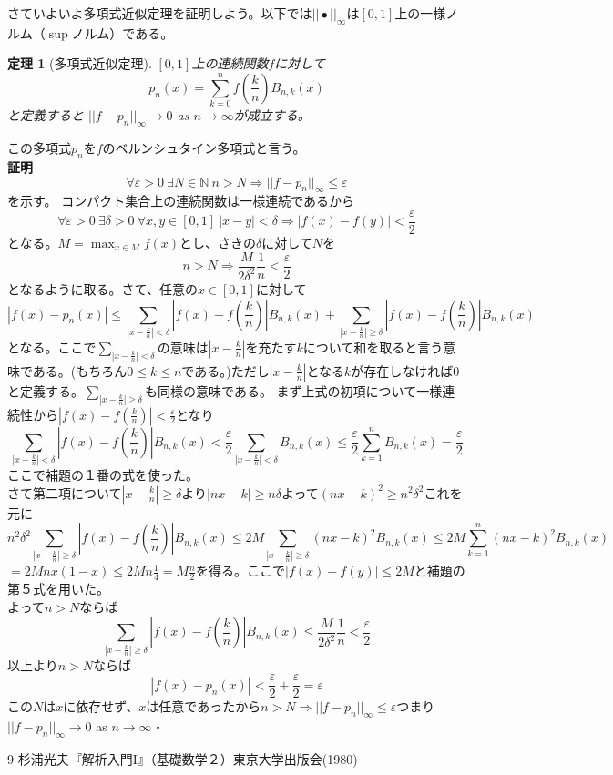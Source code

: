 \documentclass[leqno]{jsarticle}
\newtheorem{thm}{定理}
\renewcommand{\proofname}{{\bf 証明}}
\newcommand{\Be}[3]{B_{#1,#2}(#3)}
\newcommand{\bb}{B_{n,k}(x)}
\begin{document}
さていよいよ多項式近似定理を証明しよう。以下では$||\bullet||_{\infty}$は$[0,1]$上の一様ノルム（$\sup$ノルム）である。
\begin{thm}[多項式近似定理]
$[0,1]$上の連続関数$f$に対して
\[p_n(x)=\sum_{k=0}^{n}f\left(\frac{k}{n}\right)\Be{n}{k}{x}\]と定義すると
$||f-p_n||_{\infty}\rightarrow 0$ as $ n\rightarrow \infty$が成立する。
\end{thm}この多項式$p_n$を$f$のベルンシュタイン多項式と言う。\\ 
\proofname\\ 
\[
\forall \varepsilon >0\ \exists N\in \mathbb{N}\ n>N\Rightarrow ||f-p_n||_{\infty}\le\varepsilon
\]を示す。
コンパクト集合上の連続関数は一様連続であるから
\[
\forall \varepsilon>0\ \exists \delta>0\ \forall x,y\in [0,1]\ |x-y|<\delta \Rightarrow |f(x)-f(y)|<\frac{\varepsilon}{2}
\]
となる。$\displaystyle M=\max _{x\in M}f(x)$とし、さきの$\delta$に対して$N$を
\[
n>N\Rightarrow \frac{M}{2\delta^2}\frac{1}{n}<\frac{\varepsilon}{2}
\]となるように取る。さて、任意の$x\in [0,1]$に対して
\[
|f(x)-p_n(x)|\le\sum_{|x-\frac{k}{n}|<\delta}\left|f(x)-f\left(\frac{k}{n}\right)\!\right|\bb+\sum_{|x-\frac{k}{n}|\ge\delta}\left|f(x)-f\left(\frac{k}{n}\right)\!\right|\bb
\]
となる。ここで$\displaystyle \sum_{|x-\frac{k}{n}|<\delta}$の意味は$|x-\frac{k}{n}|$を充たす$k$について和を取ると言う意味である。(もちろん$0\le k\le n$である。)ただし$|x-\frac{k}{n}|$となる$k$が存在しなければ$0$と定義する。$\displaystyle \sum_{|x-\frac{k}{n}|\ge\delta}$も同様の意味である。
まず上式の初項について一様連続性から$\displaystyle{\left|f(x)-f\left(\frac{k}{n}\right)\!\right|<\frac{\varepsilon}{2}}$となり
\[
\sum_{|x-\frac{k}{n}|<\delta}\left|f(x)-f\left(\frac{k}{n}\right)\!\right|\bb<\frac{\varepsilon}{2}\sum_{|x-\frac{k}{n}|<\delta}\bb\le \frac{\varepsilon}{2}\sum_{k=1}^{n}\bb=\frac{\varepsilon}{2}
\]
ここで補題の１番の式を使った。\\ 
さて第二項について$|x-\frac{k}{n}|\ge\delta$より$|nx-k|\ge n\delta$よって$(nx-k)^2\ge n^2\delta^2$これを元に
\[
n^2\delta^2\sum_{|x-\frac{k}{n}|\ge\delta}\left|f(x)-f\left(\frac{k}{n}\right)\!\right|\bb\le 2M\sum_{|x-\frac{k}{n}|\ge\delta}(nx-k)^2\bb\le 2M\sum_{k=1}^{n}(nx-k)^2\bb\]
$
\displaystyle{=2Mnx(1-x)\le 2Mn\frac{1}{4}=M\frac{n}{2}}
$を得る。ここで$|f(x)-f(y)|\le 2M$と補題の第５式を用いた。\\ 
よって$n>N$ならば
\[
\sum_{|x-\frac{k}{n}|\ge\delta}\left|f(x)-f\left(\frac{k}{n}\right)\!\right|\bb\le \frac{M}{2\delta^2}\frac{1}{n}
<\frac{\varepsilon}{2}
\]
以上より$n>N$ならば
\[
|f(x)-p_n(x)|<\frac{\varepsilon}{2}+\frac{\varepsilon}{2}=\varepsilon
\]
この$N$は$x$に依存せず、$x$は任意であったから$n>N\Rightarrow ||f-p_n||_{\infty}\le\varepsilon$つまり$||f-p_n||_{\infty}\rightarrow 0$ as $ n\rightarrow \infty$ $\square$



\begin{thebibliography}{9}
杉浦光夫『解析入門I』（基礎数学２）東京大学出版会(1980)
\end{thebibliography}
\end{document}

